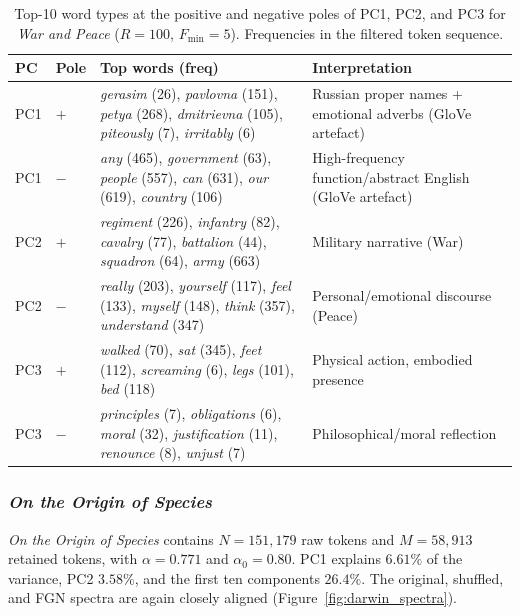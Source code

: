 \documentclass[12pt,a4paper]{article}
\begin{document}
\begin{table}[htbp]
\centering
\caption{Top-10 word types at the positive and negative poles
of PC1, PC2, and PC3 for \emph{War and Peace} ($R=100$,
$F_{\min}=5$).
Frequencies in the filtered token sequence.}
\label{tab:wrnpc_pc}
\small
\setlength{\tabcolsep}{4pt}
\begin{tabular}{ll p{6cm} p{6cm}}
\toprule
PC & Pole & Top words (freq) & Interpretation \\
\midrule
PC1 & $+$ &
  \emph{gerasim} (26), \emph{pavlovna} (151), \emph{petya} (268),
  \emph{dmitrievna} (105), \emph{piteously} (7), \emph{irritably} (6)
  & Russian proper names + emotional adverbs (GloVe artefact) \\
PC1 & $-$ &
  \emph{any} (465), \emph{government} (63), \emph{people} (557),
  \emph{can} (631), \emph{our} (619), \emph{country} (106)
  & High-frequency function/abstract English (GloVe artefact) \\
\midrule
PC2 & $+$ &
  \emph{regiment} (226), \emph{infantry} (82), \emph{cavalry} (77),
  \emph{battalion} (44), \emph{squadron} (64), \emph{army} (663)
  & Military narrative (War) \\
PC2 & $-$ &
  \emph{really} (203), \emph{yourself} (117), \emph{feel} (133),
  \emph{myself} (148), \emph{think} (357), \emph{understand} (347)
  & Personal/emotional discourse (Peace) \\
\midrule
PC3 & $+$ &
  \emph{walked} (70), \emph{sat} (345), \emph{feet} (112),
  \emph{screaming} (6), \emph{legs} (101), \emph{bed} (118)
  & Physical action, embodied presence \\
PC3 & $-$ &
  \emph{principles} (7), \emph{obligations} (6), \emph{moral} (32),
  \emph{justification} (11), \emph{renounce} (8), \emph{unjust} (7)
  & Philosophical/moral reflection \\
\bottomrule
\end{tabular}
\end{table}

\subsubsection{\emph{On the Origin of Species}}
\label{sec:darwin}

\emph{On the Origin of Species} contains $N=151{,}179$ raw tokens and
$M=58{,}913$ retained tokens, with $\alpha=0.771$ and
$\alpha_0=0.80$. PC1 explains $6.61\%$ of the variance, PC2
$3.58\%$, and the first ten components $26.4\%$. The original,
shuffled, and FGN spectra are again closely aligned
(Figure~\ref{fig:darwin_spectra}).
\end{document}
